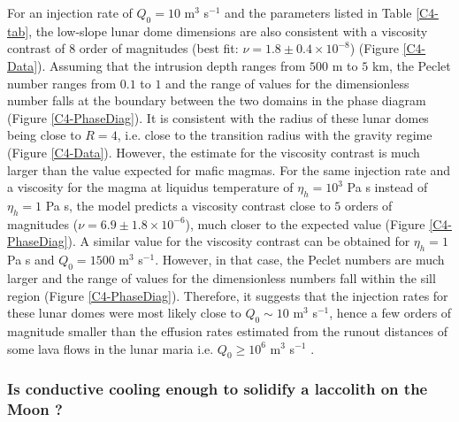 For an injection rate of  $Q_0=10$ m$^{3}$ s$^{-1}$ and the parameters
listed in Table \ref{C4-tab}, the  low-slope lunar dome dimensions are
also consistent with  a viscosity contrast of $8$  order of magnitudes
(best    fit:   $\nu=1.8    \pm   0.4    \times   10^{-8}$)    (Figure
\ref{C4-Data}). Assuming that the intrusion  depth ranges from $500$ m
to $5$ km, the Peclet number ranges from $0.1$ to $1$ and the range of
values for the dimensionless number  falls at the boundary between the
two domains in  the phase diagram (Figure  \ref{C4-PhaseDiag}).  It is
consistent with the radius of these  lunar domes being close to $R=4$,
i.e.  close to  the transition radius with the  gravity regime (Figure
\ref{C4-Data}).  However,  the estimate for the  viscosity contrast is
much larger  than the value  expected for  mafic magmas. For  the same
injection rate and  a viscosity for the magma  at liquidus temperature
of $\eta_h=10^3$ Pa s instead of $\eta_h=1$ Pa s, the model predicts a
viscosity    contrast   close    to   $5$    orders   of    magnitudes
($\nu = 6.9 \pm 1.8 \times10^{-6}$), much closer to the expected value
(Figure  \ref{C4-PhaseDiag}).   A  similar  value  for  the  viscosity
contrast  can be  obtained for  $\eta_h=1$ Pa  s and  $Q_0=1500$ m$^3$
s$^{-1}$. However,  in that case,  the Peclet numbers are  much larger
and the range of values for  the dimensionless numbers fall within the
sill region  (Figure \ref{C4-PhaseDiag}). Therefore, it  suggests that
the injection  rates for these lunar  domes were most likely  close to
$Q_0\sim 10$ m$^{3}$ s$^{-1}$, hence a few orders of magnitude smaller
than the  effusion rates estimated  from the runout distances  of some
lava  flows in  the lunar  maria  i.e.  $Q_0\ge  10^6$ m$^3$  s$^{-1}$
\citep{TracyKPGregg:1996wp}.

\subsubsection*{Is conductive  cooling enough to solidify  a laccolith
  on the Moon ?}
\label{sec:visc-contr-lunar}

